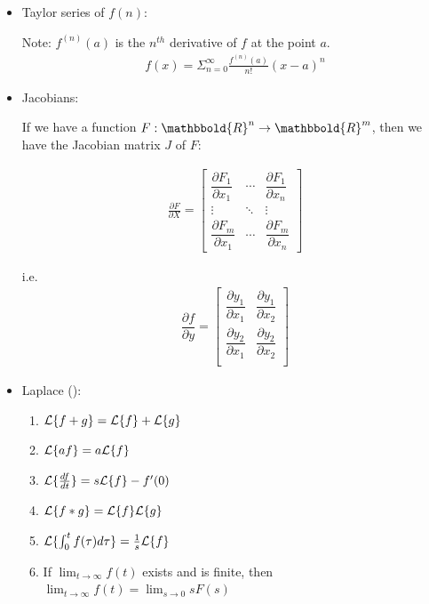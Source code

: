 \begin{itemize}
        \item Taylor series of $f(n)$:

            Note: $f^{(n)}(a)$ is the $n^{th}$ derivative of $f$ at the point $a$.
            \begin{align*} f(x) = \Sigma_{n=0}^{\infty} \frac{f^{(n)}(a)}{n!} (x-a)^n\end{align*}

        \item Jacobians:

            If we have a function $F : \mathbbold{R}^n \to \mathbbold{R}^m$, then we have the Jacobian matrix $J$ of $F$:

            \begin{align*}
                \frac{\partial{F}}{\partial{X}}=\begin{bmatrix} \dfrac{\partial F_1}{\partial x_1} & \cdots & \dfrac{\partial F_1}{\partial x_n} \\ \vdots & \ddots & \vdots \\ \dfrac{\partial F_m}{\partial x_1} & \cdots & \dfrac{\partial F_m}{\partial x_n}  \end{bmatrix}
            \end{align*}

            i.e.
            \begin{align*}
                 \dfrac{\partial f}{\partial y}
                = \begin{bmatrix} \dfrac{\partial y_1}{\partial x_1} & \dfrac{\partial y_1}{\partial x_2} \\ \dfrac{\partial y_2}{\partial x_1} & \dfrac{\partial y_2}{\partial x_2} \\ \end{bmatrix}
            \end{align*}

        \item Laplace (\Lap):

            \begin{enumerate}
                \item $ \mathcal{L}\{ f+g \} = \mathcal{L}\{ f \} + \mathcal{L}\{ g \}$
                \item $ \mathcal{L}\{ af \} = a\mathcal{L}\{ f \}$
                \item $ \mathcal{L}\{ \frac{df}{dt} \} = s\mathcal{L}\{ f \} - f'(0)$
                \item $ \mathcal{L}\{ f*g \} = \mathcal{L}\{ f \} \mathcal{L}\{ g \}$
                \item $ \mathcal{L}\{ \int_{0}^{t}f( \tau )d \tau \} = \frac{1}{s}\mathcal{L}\{ f \}$
                \item If $ \lim_{t \to \infty} f(t) $ exists and is finite, then $\lim_{t \to \infty} f(t) = \lim_{s \to 0} sF(s)$
            \end{enumerate}


\end{itemize}
